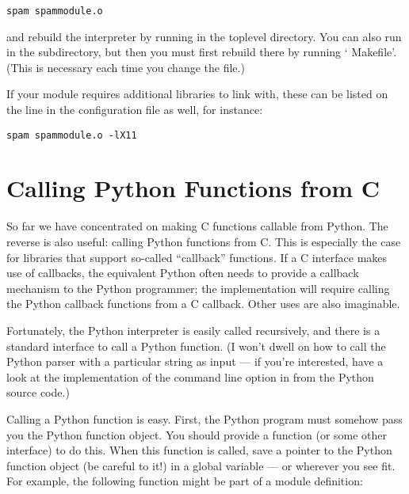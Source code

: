 \begin{verbatim}
spam spammodule.o
\end{verbatim}

and rebuild the interpreter by running  in the toplevel
directory.  You can also run  in the 
subdirectory, but then you must first rebuild 
there by running ` Makefile'.  (This is necessary each
time you change the  file.)

If your module requires additional libraries to link with, these can
be listed on the line in the configuration file as well, for instance:

\begin{verbatim}
spam spammodule.o -lX11
\end{verbatim}

\section{Calling Python Functions from C
         \label{callingPython}}

So far we have concentrated on making C functions callable from
Python.  The reverse is also useful: calling Python functions from C.
This is especially the case for libraries that support so-called
``callback'' functions.  If a C interface makes use of callbacks, the
equivalent Python often needs to provide a callback mechanism to the
Python programmer; the implementation will require calling the Python
callback functions from a C callback.  Other uses are also imaginable.

Fortunately, the Python interpreter is easily called recursively, and
there is a standard interface to call a Python function.  (I won't
dwell on how to call the Python parser with a particular string as
input --- if you're interested, have a look at the implementation of
the  command line option in 
from the Python source code.)

Calling a Python function is easy.  First, the Python program must
somehow pass you the Python function object.  You should provide a
function (or some other interface) to do this.  When this function is
called, save a pointer to the Python function object (be careful to
 it!) in a global variable --- or wherever you
see fit. For example, the following function might be part of a module
definition:

